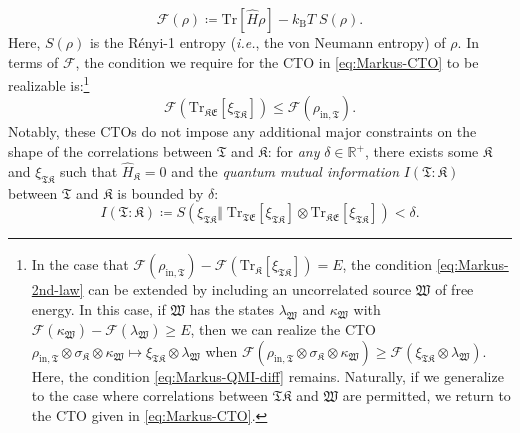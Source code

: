 \documentclass[preprints,article,accept,moreauthors,pdftex]{Definitions/mdpi}
\begin{document}
\begin{paracol}{2}
\begin{equation}
    \label{eq:noneq-F}
    \mathcal{F}\left(\rho\right) \coloneqq \mathrm{Tr}\left[\widehat{H}\rho\right] - k_{\mathrm{B}}T\!\;S\left(\rho\right).
\end{equation}
Here, $S\left(\rho\right)$ is the Rényi-1 entropy (\emph{i.e.}, the von Neumann entropy) of $\rho$. In terms of $\mathcal{F}$, the condition we require for the CTO in \eqref{eq:Markus-CTO} to be realizable is:\footnote{In the case that $\mathcal{F}\left(\rho_{\mathrm{in},\mathfrak{T}}\right) - \mathcal{F}\left(\mathrm{Tr}_{\mathfrak{K}} \left[ \xi_{\mathfrak{TK}} \right] \right) = E$, the condition \eqref{eq:Markus-2nd-law} can be extended by including an uncorrelated source $\mathfrak{W}$ of free energy. In this case, if $\mathfrak{W}$ has the states $\lambda_{\mathfrak{W}}$ and $\kappa_{\mathfrak{W}}$ with $\mathcal{F}\left(\kappa_{\mathfrak{W}}\right) - \mathcal{F}\left(\lambda_{\mathfrak{W}}\right) \geq E$, then we can realize the CTO $\rho_{\mathrm{in},\mathfrak{T}} \otimes \sigma_{\mathfrak{K}} \otimes \kappa_{\mathfrak{W}} \mapsto \xi_{\mathfrak{TK}} \otimes \lambda_{\mathfrak{W}}$ when $\mathcal{F}\left( \rho_{\mathrm{in},\mathfrak{T}} \otimes \sigma_{\mathfrak{K}} \otimes \kappa_{\mathfrak{W}} \right) \geq \mathcal{F}\left( \xi_{\mathfrak{TK}} \otimes \lambda_{\mathfrak{W}} \right)$. Here, the condition \eqref{eq:Markus-QMI-diff} remains. Naturally, if we generalize to the case where correlations between $\mathfrak{TK}$ and $\mathfrak{W}$ are permitted, we return to the CTO given in \eqref{eq:Markus-CTO}.}
\begin{equation}
    \label{eq:Markus-2nd-law}
    \mathcal{F}\left(\mathrm{Tr}_{\mathfrak{KE}} \left[ \xi_{\mathfrak{TK}} \right] \right) \leq \mathcal{F}\left(\rho_{\mathrm{in},\mathfrak{T}}\right).
\end{equation}
Notably, these CTOs do not impose any additional major constraints on the shape of the correlations between $\mathfrak{T}$ and $\mathfrak{K}$: for \emph{any} $\delta \in \mathbb{R}^{+}$, there exists some $\mathfrak{K}$ and $\xi_{\mathfrak{TK}}$ such that $\widehat{H}_{\mathfrak{K}} = 0 $ and the \emph{quantum mutual information} $I\left(\mathfrak{T}:\mathfrak{K}\right)$ between $\mathfrak{T}$ and $\mathfrak{K}$ is bounded by $\delta$:
\begin{equation}
    \label{eq:Markus-QMI-diff}
    I\left(\mathfrak{T} :\mathfrak{K} \right) \coloneqq S\left(\xi_{\mathfrak{TK}} \Vert \;\! \mathrm{Tr}_{\mathfrak{TE}} \left[\xi_{\mathfrak{TK}}\right] \otimes \mathrm{Tr}_{\mathfrak{KE}} \left[\xi_{\mathfrak{TK}}\right] \right) < \delta.

\end{equation}
\end{paracol}
\end{document}
